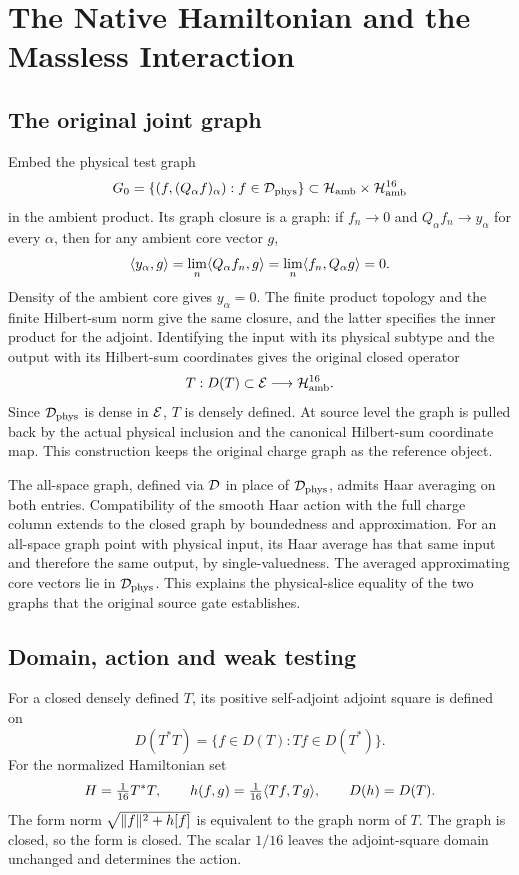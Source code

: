 \chapter{The Native Hamiltonian and the Massless Interaction}\label{ch:ham}

\section{The original joint graph}
Embed the physical test graph
\[
 G_0=\{(f,(Q_\alpha f)_\alpha):f\in\mathcal D_{\mathrm{phys}}\}
       \subset\mathcal H_{\mathrm{amb}}\times \mathcal H_{\mathrm{amb}}^{16}
\]
in the ambient product. Its graph closure is a graph: if $f_n\to0$ and $Q_\alpha f_n\to y_\alpha$ for every $\alpha$, then for any ambient core vector $g$,
\[
 \langle y_\alpha,g\rangle=\lim_n\langle Q_\alpha f_n,g\rangle
                =\lim_n\langle f_n,Q_\alpha g\rangle=0.
\]
Density of the ambient core gives $y_\alpha=0$. The finite product topology and the finite Hilbert-sum norm give the same closure, and the latter specifies the inner product for the adjoint. Identifying the input with its physical subtype and the output with its Hilbert-sum coordinates gives the original closed operator
\[
 T:D(T)\subset\mathcal E\longrightarrow\mathcal H_{\mathrm{amb}}^{16}.
\]
Since $\mathcal D_{\mathrm{phys}}$ is dense in $\mathcal E$, $T$ is densely defined. At source level the graph is pulled back by the actual physical inclusion and the canonical Hilbert-sum coordinate map. This construction keeps the original charge graph as the reference object.

The all-space graph, defined via $\mathcal D$ in place of $\mathcal D_{\mathrm{phys}}$, admits Haar averaging on both entries. Compatibility of the smooth Haar action with the full charge column extends to the closed graph by boundedness and approximation. For an all-space graph point with physical input, its Haar average has that same input and therefore the same output, by single-valuedness. The averaged approximating core vectors lie in $\mathcal D_{\mathrm{phys}}$. This explains the physical-slice equality of the two graphs that the original source gate establishes.

\section{Domain, action and weak testing}
For a closed densely defined $T$, its positive self-adjoint adjoint square is defined on
\[
 D(T^\ast T)=\{f\in D(T):Tf\in D(T^\ast)\}.
\]
For the normalized Hamiltonian set
\[
 H=\tfrac1{16}T^\ast T,\qquad
 h(f,g)=\tfrac1{16}\langle Tf,Tg\rangle,\qquad D(h)=D(T).
\]
The form norm $\sqrt{\lVert f\rVert^2+h[f]}$ is equivalent to the graph norm of $T$. The graph is closed, so the form is closed. The scalar $1/16$ leaves the adjoint-square domain unchanged and determines the action.

